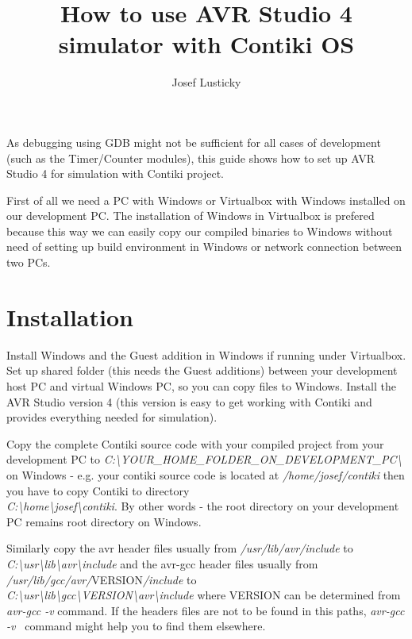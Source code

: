 \documentclass{article}
\begin{document}
\title{How to use AVR Studio 4 simulator with Contiki OS}
\author{Josef Lusticky}

\maketitle

As debugging using GDB might not be sufficient for all cases of development (such as the Timer/Counter modules),
this guide shows how to set up AVR Studio 4 for simulation with Contiki project.

First of all we need a PC with Windows or Virtualbox with Windows installed on our development PC.
The installation of Windows in Virtualbox is prefered because this way we can easily copy our compiled binaries to Windows
without need of setting up build environment in Windows or network connection between two PCs.

\section{Installation}
Install Windows and the Guest addition in Windows if running under Virtualbox.
Set up shared folder (this needs the Guest additions) between your development host PC and virtual Windows PC, so you can copy files to Windows.
Install the AVR Studio version 4 (this version is easy to get working with Contiki and provides everything needed for simulation).

Copy the complete Contiki source code with your compiled project from your development PC to
{\it{C:\textbackslash YOUR\_HOME\_FOLDER\_ON\_DEVELOPMENT\_PC\textbackslash}}
on Windows - e.g. your contiki source code is located at {\it{/home/josef/contiki}}
then you have to copy Contiki to directory \\
{\it{C:\textbackslash home\textbackslash josef\textbackslash contiki}}.
By other words - the root directory on your development PC remains root directory on Windows.

Similarly copy the avr header files usually from {\it{/usr/lib/avr/include}} to
{\it{C:\textbackslash usr\textbackslash lib\textbackslash avr\textbackslash include}}
and the avr-gcc header files usually from {\it{/usr/lib/gcc/avr/}}VERSION{\it{/include}} to \\
{\it{C:\textbackslash usr\textbackslash lib\textbackslash gcc\textbackslash VERSION\textbackslash avr\textbackslash include}}
where VERSION can be determined from {\it{avr-gcc -v}} command.
If the headers files are not to be found in this paths, {\it{avr-gcc -v }} command might help you to find them elsewhere.
\end{document}
